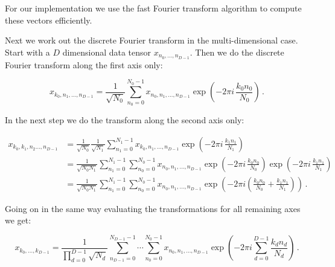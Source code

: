 For our implementation we use the fast Fourier transform algorithm to compute
these vectors efficiently.

Next we work out the discrete Fourier transform in the multi-dimensional case.
Start with a $D$ dimensional data tensor $x_{n_0, \ldots, n_{D-1}}$. Then we
do the discrete Fourier transform along the first axis only:

\begin{equation*}
  x_{k_0, n_1, \ldots, n_{D-1}} = \frac{1}{\sqrt{N_0}}
                                  \sum_{n_0 = 0}^{N_0-1} x_{n_0, n_1, \ldots, n_{D-1}}
                                  \exp\left(-2\pi i \, \frac{k_0 n_0}{N_0}\right) \,.
\end{equation*}

In the next step we do the transform along the second axis only:

\begin{align*}
  x_{k_0, k_1, n_2 \ldots, n_{D-1}}
  & = \frac{1}{\sqrt{N_0}} \frac{1}{\sqrt{N_1}}
      \sum_{n_1 = 0}^{N_1-1} x_{k_0, n_1, \ldots, n_{D-1}} \exp\left(-2\pi i \, \frac{k_1 n_1}{N_1}\right) \\
  & = \frac{1}{\sqrt{N_0 N_1}}
      \sum_{n_1 = 0}^{N_1-1} \sum_{n_0 = 0}^{N_0-1} x_{n_0, n_1, \ldots, n_{D-1}}
                             \exp\left(-2\pi i \, \frac{k_0 n_0}{N_0}\right)
                             \exp\left(-2\pi i \, \frac{k_1 n_1}{N_1}\right) \\
  & = \frac{1}{\sqrt{N_0 N_1}}
      \sum_{n_1 = 0}^{N_1-1} \sum_{n_0 = 0}^{N_0-1} x_{n_0, n_1, \ldots, n_{D-1}}
                             \exp\left(-2\pi i \left(\frac{k_0 n_0}{N_0}+\frac{k_1 n_1}{N_1}\right) \right) \,.
\end{align*}

Going on in the same way evaluating the transformations for all remaining axes we
get:

\begin{equation*}
  x_{k_0, \ldots, k_{D-1}}
  = \frac{1}{\prod_{d=0}^{D-1} \sqrt{N_d} }
    \sum_{n_{D-1} = 0}^{N_{D-1}-1} \cdots \sum_{n_0 = 0}^{N_0-1} x_{n_0, n_1, \ldots, n_{D-1}}
                             \exp\left(-2\pi i \sum_{d=0}^{D-1} \frac{k_d n_d}{N_d} \right) \,.
\end{equation*}

%
%

